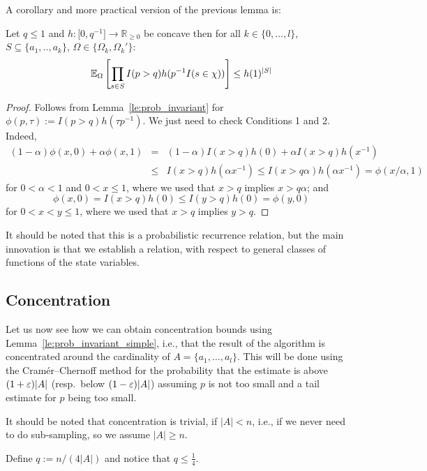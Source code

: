A corollary and more practical version of the previous lemma is:
\begin{lemma}\label{le:prob_invariant_simple}
Let $q \leq 1$ and $h : \mathbb [0,q^{-1}] \rightarrow \mathbb R_{\geq 0}$ be concave then for all
$k \in \{0,\ldots,l\}$, $S \subseteq \{a_1,..,a_k\}$, $\Omega \in \{\Omega_k,\Omega_k'\}$:
\[
  \operatorname{\mathbb E}_{\Omega}\left[ \prod_{s \in S} I(p>q) h(p^{-1} I(s \in \chi)) \right] \leq h(1)^{|S|}
\]
\end{lemma}
\begin{proof}
Follows from Lemma~\ref{le:prob_invariant} for $\phi(p,\tau) := I(p > q) h(\tau p^{-1})$. We just
need to check Conditions 1 and 2. Indeed,
\begin{eqnarray*}
  (1-\alpha) \phi(x,0) + \alpha \phi(x,1) & = & (1-\alpha) I(x>q) h(0) + \alpha I(x>q) h(x^{-1}) \\
   & \leq & I(x > q) h(\alpha x^{-1}) \leq I(x > q \alpha) h(\alpha x^{-1}) = \phi(x/\alpha,1)
\end{eqnarray*}
for $0 < \alpha < 1$ and $0< x \leq 1$, where we used that $x > q$ implies $x > q \alpha$; and
\[
  \phi(x,0) = I(x>q) h(0) \leq I(y > q) h(0) = \phi(y,0)
\]
for $0 < x < y \leq 1$, where we used that $x > q$ implies $y > q$.
\end{proof}

It should be noted that this is a probabilistic recurrence relation, but the main innovation is that
we establish a relation, with respect to general classes of functions of the state variables.

\subsection{Concentration}
Let us now see how we can obtain concentration bounds using Lemma~\ref{le:prob_invariant_simple}, i.e., that
the result of the algorithm is concentrated around the cardinality of $A = \{ a_1, \ldots, a_l \}$.
This will be done using the Cram\'{e}r--Chernoff method for the probability that the estimate is
above $(1+\varepsilon)|A|$ (resp.~below $(1-\varepsilon)|A|$) assuming $p$ is not too small and a tail estimate
for $p$ being too small.

It should be noted that concentration is trivial, if $|A| < n$, i.e., if we never need to do
sub-sampling, so we assume $|A| \geq n$.

Define $q := n/(4|A|)$ and notice that $q \leq \frac{1}{4}$.

